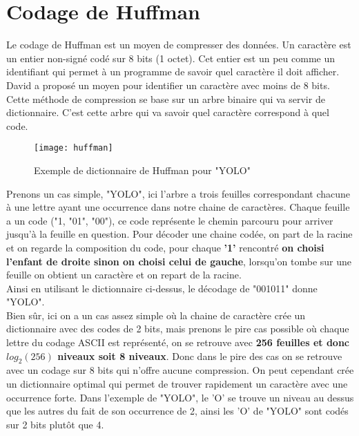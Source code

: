\documentclass[11pt]{extarticle}
\begin{document}
\section{Codage de Huffman}
Le codage de Huffman est un moyen de compresser des données. Un caractère est un entier non-signé codé sur 8 bits (1 octet). Cet entier est un peu comme un identifiant qui permet à un programme de savoir quel caractère il doit afficher. David a proposé un moyen pour identifier un caractère avec moins de 8 bits. \\
Cette méthode de compression se base sur un arbre binaire qui va servir de dictionnaire. C'est cette arbre qui va savoir quel caractère correspond à quel code.\\
\begin{figure}[H]
\begin{center}
\texttt{[image: huffman]}
\end{center}
\caption{Exemple de dictionnaire de Huffman pour "YOLO"}
\end{figure}
Prenons un cas simple, "YOLO", ici l'arbre a trois feuilles correspondant chacune à une lettre ayant une occurrence dans notre chaine de caractères. Chaque feuille a un code ("1, "01", "00"), ce code représente le chemin parcouru pour arriver jusqu'à la feuille en question. Pour décoder une chaine codée, on part de la racine et on regarde la composition du code, pour chaque \textbf{'1'} rencontré \textbf{on choisi l'enfant de droite sinon on choisi celui de gauche}, lorsqu'on tombe sur une feuille on obtient un caractère et on repart de la racine. \\
Ainsi en utilisant le dictionnaire ci-dessus, le décodage de "001011" donne "YOLO". \\
Bien sûr, ici on a un cas assez simple où la chaine de caractère crée un dictionnaire avec des codes de 2 bits, mais prenons le pire cas possible où chaque lettre du codage ASCII est représenté, on se retrouve avec \textbf{256 feuilles et donc $log_2(256)$ niveaux soit 8 niveaux}. Donc dans le pire des cas on se retrouve avec un codage sur 8 bits qui n'offre aucune compression. On peut cependant crée un dictionnaire optimal qui permet de trouver rapidement un caractère avec une occurrence forte. Dans l'exemple de "YOLO", le 'O' se trouve un niveau au dessus que les autres du fait de son occurrence de 2, ainsi les 'O' de "YOLO" sont codés sur 2 bits plutôt que 4. 
\end{document}
